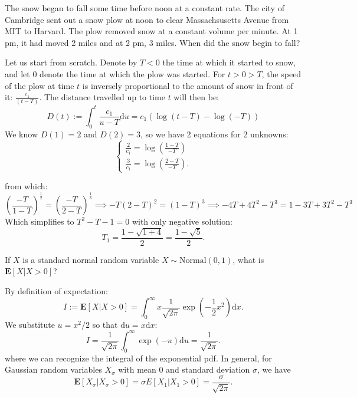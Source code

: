 \begin{qanda} %
    \Q The snow began to fall some time before noon at a constant rate.
    The city of Cambridge sent out a snow plow at noon to clear Massachsusetts Avenue from MIT to Harvard. 
    The plow removed snow at a constant volume per minute.
    At 1 pm, it had moved 2 miles and at 2 pm, 3 miles.
    When did the snow begin to fall?

    \A
    Let us start from scratch.
    Denote by $T<0$ the time at which it started to snow, and let $0$ denote the time at which the plow was started.
    For $t>0>T$, the speed of the plow at time $t$ is inversely proportional to the amount of snow in front of it: $\frac{c_1}{(t-T)}$. The distance travelled up to time $t$ will then be: 
    \[
    D(t):=\int_{0}^{t} \frac{c_1}{u-T} \mathrm{d}u = c_1 (\log(t-T) - \log(-T))
    \]
    We know $D(1) = 2$ and $D(2) = 3$, so we have 2 equations for 2 unknowns:
    \[
        \begin{cases}
            \frac{2}{c_1} = \log \left( \frac{1-T}{-T}  \right) \\
            \frac{3}{c_1} = \log \left( \frac{2-T}{-T}  \right).
        \end{cases}
    \]

    from which:
    \[
    \left( \frac{-T}{1-T} \right)^\frac{1}{2} = \left( \frac{-T}{2-T} \right)^\frac{1}{3} \implies 
    -T (2-T)^2 = (1-T)^3 \implies
    -4T +4T^2 -T^3 = 1 - 3T + 3T^2 - T^3
    \]
    Which simplifies to $T^2 - T - 1 = 0$ with only negative solution: 
    \[
        T_1 = \frac{1 - \sqrt{1 + 4}}{2} = \frac{1 - \sqrt{5}}{2}.
    \]
\end{qanda}

\begin{qanda} %
    \Q If $X$ is a standard normal random variable $X \sim \text{Normal}(0,1)$, what is $\mathbf{E}[X | X > 0]$?

    \A 
    By definition of expectation:
    \[
        I := \mathbf{E}[X | X > 0] = \int_{0}^{\infty} x \frac{1}{\sqrt{2 \pi}} \exp \left( -\frac{1}{2} x^2 \right) \mathrm{d}x.
    \]
    We substitute $u = x^2 / 2$ so that $\mathrm{d}u = x \mathrm{d}x$:
    \[
    I = \frac{1}{\sqrt{2\pi}} \int_{0}^{\infty}  \exp(-u)\mathrm{d}u = \frac{1}{\sqrt{2 \pi}} .
    \]
    where we can recognize the integral of the exponential pdf.
    In general, for Gaussian random variables $X_\sigma$ with mean 0 and standard deviation $\sigma$, we have 
    \[
        \mathbf{E}[X_\sigma | X_\sigma > 0] =  \sigma E[X_1 | X_1 > 0] = \frac{\sigma}{\sqrt{2\pi}}.
    \]
  
\end{qanda}


